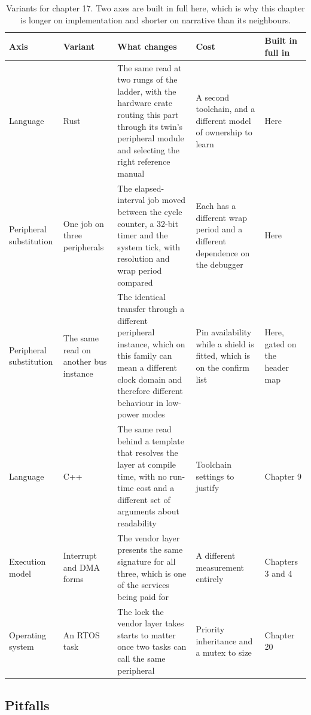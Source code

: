 \begin{table}[H]\centering\small
\begin{tabular}{p{24mm}p{26mm}p{44mm}p{22mm}p{20mm}}
\toprule
Axis & Variant & What changes & Cost & Built in full in \\
\midrule
Language & Rust & The same read at two rungs of the ladder, with the hardware crate routing this part through its twin's peripheral module and selecting the right reference manual & A second toolchain, and a different model of ownership to learn & Here \\
Peripheral substitution & One job on three peripherals & The elapsed-interval job moved between the cycle counter, a 32-bit timer and the system tick, with resolution and wrap period compared & Each has a different wrap period and a different dependence on the debugger & Here \\
Peripheral substitution & The same read on another bus instance & The identical transfer through a different peripheral instance, which on this family can mean a different clock domain and therefore different behaviour in low-power modes & Pin availability while a shield is fitted, which is on the confirm list & Here, gated on the header map \\
Language & C++ & The same read behind a template that resolves the layer at compile time, with no run-time cost and a different set of arguments about readability & Toolchain settings to justify & Chapter 9 \\
Execution model & Interrupt and DMA forms & The vendor layer presents the same signature for all three, which is one of the services being paid for & A different measurement entirely & Chapters 3 and 4 \\
Operating system & An RTOS task & The lock the vendor layer takes starts to matter once two tasks can call the same peripheral & Priority inheritance and a mutex to size & Chapter 20 \\
\bottomrule
\end{tabular}
\caption{Variants for chapter 17. Two axes are built in full here, which is why this chapter is longer on implementation and shorter on narrative than its neighbours.}
\end{table}

\subsection*{Pitfalls}

